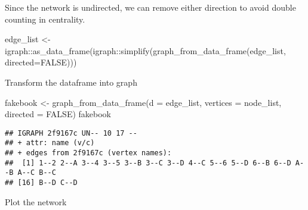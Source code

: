 \documentclass[
]{article}
\newenvironment{Shaded}{\begin{snugshade}}{\end{snugshade}}
\newcommand{\AttributeTok}[1]{\textcolor[rgb]{0.77,0.63,0.00}{#1}}
\newcommand{\ConstantTok}[1]{\textcolor[rgb]{0.00,0.00,0.00}{#1}}
\newcommand{\DecValTok}[1]{\textcolor[rgb]{0.00,0.00,0.81}{#1}}
\newcommand{\FloatTok}[1]{\textcolor[rgb]{0.00,0.00,0.81}{#1}}
\newcommand{\FunctionTok}[1]{\textcolor[rgb]{0.00,0.00,0.00}{#1}}
\newcommand{\NormalTok}[1]{#1}
\newcommand{\OtherTok}[1]{\textcolor[rgb]{0.56,0.35,0.01}{#1}}
\newcommand{\SpecialCharTok}[1]{\textcolor[rgb]{0.00,0.00,0.00}{#1}}
\newcommand{\StringTok}[1]{\textcolor[rgb]{0.31,0.60,0.02}{#1}}
\begin{document}
Since the network is undirected, we can remove either direction to avoid
double counting in centrality.

\begin{Shaded}
\begin{Highlighting}[]
\NormalTok{edge\_list }\OtherTok{\textless{}{-}}\NormalTok{ igraph}\SpecialCharTok{::}\FunctionTok{as\_data\_frame}\NormalTok{(igraph}\SpecialCharTok{::}\FunctionTok{simplify}\NormalTok{(}\FunctionTok{graph\_from\_data\_frame}\NormalTok{(edge\_list, }\AttributeTok{directed=}\ConstantTok{FALSE}\NormalTok{)))}
\end{Highlighting}
\end{Shaded}

Transform the dataframe into graph

\begin{Shaded}
\begin{Highlighting}[]
\NormalTok{fakebook }\OtherTok{\textless{}{-}} \FunctionTok{graph\_from\_data\_frame}\NormalTok{(}\AttributeTok{d =}\NormalTok{ edge\_list, }\AttributeTok{vertices =}\NormalTok{ node\_list, }\AttributeTok{directed =} \ConstantTok{FALSE}\NormalTok{)}
\NormalTok{fakebook}
\end{Highlighting}
\end{Shaded}

\begin{verbatim}
## IGRAPH 2f9167c UN-- 10 17 -- 
## + attr: name (v/c)
## + edges from 2f9167c (vertex names):
##  [1] 1--2 2--A 3--4 3--5 3--B 3--C 3--D 4--C 5--6 5--D 6--B 6--D A--B A--C B--C
## [16] B--D C--D
\end{verbatim}

Plot the network

\begin{Shaded}
\end{Shaded}
\end{document}
